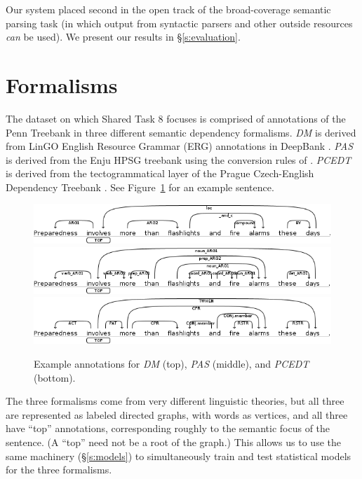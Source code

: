 \documentclass[11pt]{article}
\newcommand{\sam}[1]{\textcolor{blue}{[#1 -SMT]}}
\renewcommand{\sam}[1]{}
\begin{document}
Our system placed second in the open track of the broad-coverage semantic
parsing task (in which output from syntactic parsers and other outside resources \emph{can} be used).
We present our results in \S\ref{s:evaluation}.



\section{Formalisms} \label{s:formalisms}
The dataset on which Shared Task 8 focuses is comprised of annotations of the Penn Treebank in three different semantic dependency formalisms.
\emph{DM} is derived from LinGO English Resource Grammar (ERG)
annotations in DeepBank \cite{flickinger_deepbank_2012}.
\emph{PAS} is derived from the Enju HPSG treebank using the
conversion rules of .
\emph{PCEDT} is derived from the tectogrammatical layer of the
Prague Czech-English Dependency Treebank \cite{hajic_building_1998}.
See Figure~\ref{fig:formalisms} for an example sentence.
\begin{figure}
	\centering
		\includegraphics[width=.5\textwidth]{fig/example_dm} \\
		\includegraphics[width=.5\textwidth]{fig/example_pas} \\
		\includegraphics[width=.5\textwidth]{fig/example_pcedt}
	\caption{Example annotations for \emph{DM} (top), \emph{PAS}
          (middle), and \emph{PCEDT} (bottom).}
	\label{fig:formalisms}
\end{figure}

The three formalisms come from very different linguistic theories, but all
three are represented as labeled directed graphs, with words as vertices, and
all three have ``top'' annotations, corresponding roughly to the
semantic focus of the sentence.  
(A ``top'' need not be a root of the
graph.)
This allows us to use the same machinery (\S\ref{s:models}) to simultaneously
train and test statistical models for the three formalisms.
\sam{Stats about \% multiple roots, \% multiple tops, \% tree, \% acyclic}
\end{document}

